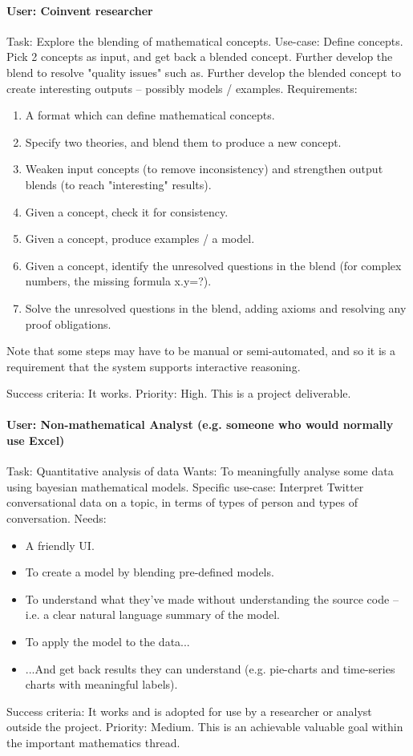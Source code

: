 \documentclass[a4paper,twoside,11pt]{article}
\begin{document}
\begin{appendices}
\paragraph{User: Coinvent researcher}
Task: Explore the blending of mathematical concepts.      
Use-case: Define concepts. Pick 2 concepts as input, and get back a blended concept. Further develop the blend to resolve "quality issues" such as.
Further develop the blended concept to create interesting outputs -- possibly models / examples.   
Requirements: 
\begin{enumerate}
\item A format which can define mathematical concepts.
\item Specify two theories, and blend them to produce a new concept.
\item Weaken input concepts (to remove inconsistency) and strengthen output blends (to reach "interesting" results). 
\item Given a concept, check it for consistency.
\item Given a concept, produce examples / a model.
\item Given a concept, identify the unresolved questions in the blend (for complex numbers, the missing formula x.y=?).
\item Solve the unresolved questions in the blend, adding axioms and resolving any proof obligations.
\end{enumerate}
Note that some steps may have to be manual or semi-automated, and so it is a requirement that the
system supports interactive reasoning.

Success criteria: It works.       
Priority: High. This is a project deliverable.
 
 
\paragraph{User: Non-mathematical Analyst (e.g. someone who would normally use Excel)}  
Task: Quantitative analysis of data   
Wants: To meaningfully analyse some data using bayesian mathematical models.   
Specific use-case: Interpret Twitter conversational data on a topic, in terms of types of person and types of conversation.   
Needs:
\begin{itemize}
 \item A friendly UI.
 \item To create a model by blending pre-defined models.
 \item To understand what they've made without understanding the source code -- i.e. a clear natural language summary of the model.
 \item To apply the model to the data...
 \item ...And get back results they can understand (e.g. pie-charts and time-series charts with meaningful labels).
\end{itemize}
Success criteria: It works and is adopted for use by a researcher or analyst outside the project.   
Priority: Medium. This is an achievable valuable goal within the important mathematics thread.



\end{appendices}
\end{document}
